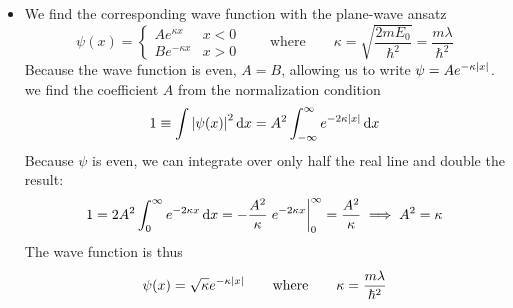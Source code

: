 \documentclass[11pt, a4paper]{article}
\newcommand{\diff}{\mathop{}\!\mathrm{d}} %
\newcommand{\eqtext}[1]{\qquad \text{#1} \qquad}
\begin{document}
\begin{itemize}
	\item We find the corresponding wave function with the plane-wave ansatz
	\begin{equation*}
		\psi(x) =
		\begin{cases}
			A e^{\kappa x} & x < 0\\
			B e^{-\kappa x} & x > 0
		\end{cases}
		\eqtext{where} \kappa = \sqrt{\frac{2mE_{0}}{\hbar^{2}}} = \frac{m\lambda}{\hbar^{2}}
	\end{equation*}
	Because the wave function is even, $ A = B $, allowing us to write $ \psi = Ae^{-\kappa \abs{x}} $. we find the coefficient $ A $ from the normalization condition
	\begin{equation*}
		1 \equiv \int \abs{\psi(x)}^{2} \diff x = A^{2} \int_{-\infty}^{\infty} e^{-2\kappa \abs{x}} \diff x
	\end{equation*}
	Because $ \psi $ is even, we can integrate over only half the real line and double the result:
	\begin{equation*}
		1 = 2A^{2} \int_{0}^{\infty} e^{-2\kappa x} \diff x = - \frac{A^{2}}{\kappa} \eval{e^{-2\kappa x}}_{0}^{\infty} = \frac{A^{2}}{\kappa} \implies A^{2} = \kappa
	\end{equation*}
	The wave function is thus
	\begin{equation*}
		\psi(x) = \sqrt{\kappa} e^{-\kappa \abs{x}} \eqtext{where} \kappa = \frac{m\lambda}{\hbar^{2}}
	\end{equation*}
	
\end{itemize}
\end{document}
